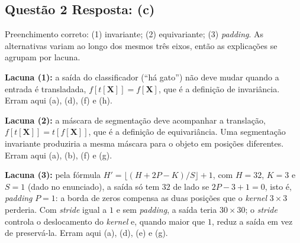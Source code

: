 \documentclass[11pt,a4paper]{article}
\begin{document}
\subsection*{Questão 2 \textemdash{} Resposta: (c)}
Preenchimento correto: (1) invariante; (2) equivariante; (3) \textit{padding}. As alternativas variam ao longo dos mesmos três eixos, então as explicações se agrupam por lacuna.

\textbf{Lacuna (1):} a saída do classificador (``há gato'') não deve mudar quando a entrada é transladada, $f[t[\mathbf{X}]] = f[\mathbf{X}]$, que é a definição de invariância. Erram aqui (a), (d), (f) e (h).

\textbf{Lacuna (2):} a máscara de segmentação deve acompanhar a translação, $f[t[\mathbf{X}]] = t[f[\mathbf{X}]]$, que é a definição de equivariância. Uma segmentação invariante produziria a mesma máscara para o objeto em posições diferentes. Erram aqui (a), (b), (f) e (g).

\textbf{Lacuna (3):} pela fórmula $H' = \lfloor (H + 2P - K)/S \rfloor + 1$, com $H = 32$, $K = 3$ e $S = 1$ (dado no enunciado), a saída só tem $32$ de lado se $2P - 3 + 1 = 0$, isto é, \textit{padding} $P = 1$: a borda de zeros compensa as duas posições que o \textit{kernel} $3 \times 3$ perderia. Com \textit{stride} igual a $1$ e sem \textit{padding}, a saída teria $30 \times 30$; o \textit{stride} controla o deslocamento do \textit{kernel} e, quando maior que $1$, reduz a saída em vez de preservá-la. Erram aqui (a), (d), (e) e (g).
\end{document}
